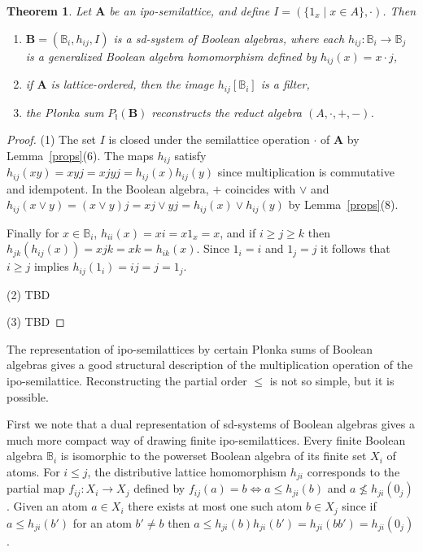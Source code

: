 \documentclass[12pt]{amsart}
\newtheorem{theorem}{Theorem}%
\newcommand{\m}{\mathbf} %
\begin{document}
\begin{theorem}\label{Bsystem}
Let $\m A$ be an ipo-semilattice, and define $I=(\{1_x\mid x\in A\},\cdot)$.
Then
\begin{enumerate}
\item $\m B=(\mathbb B_i,h_{ij},I)$ is a sd-system of Boolean algebras, where each $h_{ij}:\mathbb B_i\to \mathbb B_j$ is a generalized Boolean algebra homomorphism
defined by $h_{ij}(x)=x\cdot j$,
\item if $\m A$ is lattice-ordered, then the image $h_{ij}[\mathbb B_i]$ is a filter,
\item the P\l onka sum $P_\text{\l}(\m B)$ reconstructs the reduct algebra $(A,\cdot,+,-)$.
\end{enumerate}
\end{theorem}
\begin{proof} (1) The set $I$ is closed under the semilattice operation $\cdot$ of $\m A$ by Lemma~\ref{props}(6). The maps $h_{ij}$ satisfy
$h_{ij}(xy)=xyj=xjyj=h_{ij}(x)h_{ij}(y)$ since multiplication is commutative and idempotent.
In the Boolean algebra, $+$ coincides with $\vee$
and $h_{ij}(x\vee y)=(x\vee y)j= xj\vee yj=h_{ij}(x)\vee h_{ij}(y)$ by Lemma~\ref{props}(8). 

Finally for $x\in\mathbb B_i$, $h_{ii}(x)=xi=x1_x=x$, and if $i\ge j\ge k$ then $h_{jk}(h_{ij}(x))=xjk=xk=h_{ik}(x)$. Since
 $1_i=i$ and $1_j=j$ it follows that $i\ge j$ implies $h_{ij}(1_i)=ij=j=1_j$.

(2) TBD

(3) TBD
\end{proof}

The representation of ipo-semilattices by certain P\l onka sums of Boolean algebras gives a good structural description of the multiplication operation of the ipo-semilattice. Reconstructing the partial order $\le$ is not so simple, but it is possible.

First we note that a dual representation of sd-systems of Boolean algebras gives a much more compact way of drawing finite ipo-semilattices. Every finite Boolean algebra $\mathbb B_i$ is isomorphic to the powerset Boolean algebra of its finite set $X_i$ of atoms. For $i\le j$, the distributive lattice homomorphism $h_{ji}$ corresponds to the partial map $f_{ij}:X_i\to X_j$
defined by $f_{ij}(a)=b\iff a\le h_{ji}(b)$ and $a\nleq h_{ji}(0_j)$. Given an atom $a\in X_i$ there
exists at most one such atom $b\in X_j$ since if $a\le h_{ji}(b')$ for an atom $b'\ne b$ then
$a\le h_{ji}(b)h_{ji}(b')=h_{ji}(bb')=h_{ji}(0_j)$.
\end{document}
